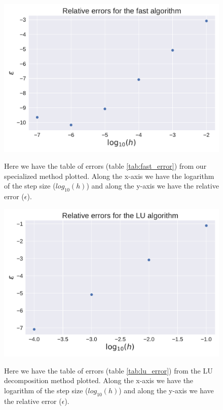 \documentclass[reprint, english,notitlepage]{revtex4-1}  %
\begin{document}
\begin{figure}[h]
	\centering
  \includegraphics[width=\linewidth]{../output/fast_errors.pdf}
	\label{fig:fast_error}
	\caption{Here we have the table of errors (table \ref{tab:fast_error}) from our specialized method plotted. Along the x-axis we have the logarithm of the step size ($log_{10}(h)$) and along the y-axis we have the relative error ($\epsilon$).}
\end{figure}

\begin{figure}[h]
	\centering
  \includegraphics[width=\linewidth]{../output/LU_errors.pdf}
	\label{fig:lu_error}
	\caption{Here we have the table of errors (table \ref{tab:lu_error}) from the LU decomposition method plotted. Along the x-axis we have the logarithm of the step size ($log_{10}(h)$) and along the y-axis we have the relative error ($\epsilon$).}
\end{figure}
\end{document}
